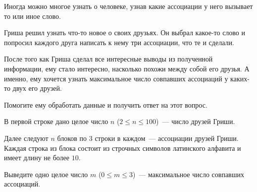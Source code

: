 Иногда можно многое узнать о человеке, узнав какие ассоциации у него вызывает
то или иное слово.

Гриша решил узнать что-то новое о своих друзьях. Он выбрал какое-то слово
и попросил каждого друга написать к нему три ассоциации, что те и сделали.

После того как Гриша сделал все интересные выводы из полученной информации, ему
стало интересно, насколько похожи между собой его друзья. А именно, ему хочется
узнать максимальное число совпавших ассоциаций у каких-то двух его друзей.

Помогите ему обработать данные и получить ответ на этот вопрос.

\InputFile

В первой строке дано целое число $n$ ($2 \le n \le 100$)~--- число друзей
Гриши.

Далее следуют $n$ блоков по $3$ строки в каждом~--- ассоциации друзей Гриши.
Каждая строка из блока состоит из строчных символов латинского алфавита и имеет
длину не более $10$.

\OutputFile

Выведите одно целое число $m$ ($0 \le m \le 3$)~--- максимальное число
совпавших ассоциаций.

\SAMPLES
